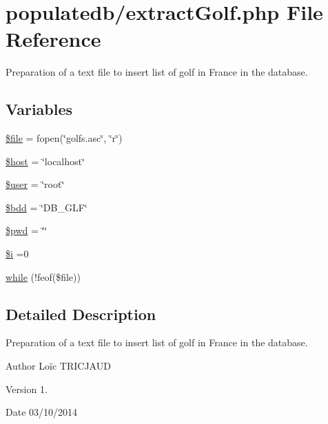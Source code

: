 \hypertarget{extract_golf_8php}{\section{populatedb/extract\-Golf.php File Reference}
\label{extract_golf_8php}
}


Preparation of a text file to insert list of golf in France in the database.  


\subsection*{Variables}
\begin{DoxyCompactItemize}
\item 
\hyperlink{extract_golf_8php_aa1bfbd27060176201b271918dff57e8f}{\$file} = fopen(\char`\"{}golfs.\-asc\char`\"{}, \char`\"{}r\char`\"{})
\item 
\hyperlink{extract_golf_8php_a711797613cb863ca0756df789c396bf2}{\$host} = \char`\"{}localhost\char`\"{}
\item 
\hyperlink{extract_golf_8php_a598ca4e71b15a1313ec95f0df1027ca5}{\$user} = \char`\"{}root\char`\"{}
\item 
\hyperlink{extract_golf_8php_a94f91e878bce0991e2cd595c5dd79b3f}{\$bdd} = \char`\"{}D\-B\-\_\-\-G\-L\-F\char`\"{}
\item 
\hyperlink{extract_golf_8php_a12e4252e778952d356721bc655cff8c8}{\$pwd} = \char`\"{}\char`\"{}
\item 
\hyperlink{extract_golf_8php_a83018d9153d17d91fbcf3bc10158d34f}{\$i} =0
\item 
\hyperlink{extract_golf_8php_a4eebe21070c3a655a77e55ea3fe137f5}{while} (!feof(\$file))
\end{DoxyCompactItemize}


\subsection{Detailed Description}
Preparation of a text file to insert list of golf in France in the database. \begin{DoxyAuthor}{Author}
Loïc T\-R\-I\-C\-J\-A\-U\-D 
\end{DoxyAuthor}
\begin{DoxyVersion}{Version}
1. 
\end{DoxyVersion}
\begin{DoxyDate}{Date}
03/10/2014 
\end{DoxyDate}


